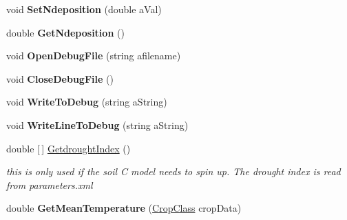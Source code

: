 \begin{DoxyCompactItemize}
\item 
\mbox{\label{struct_global_vars_1_1zone_specific_data_aadeeac9ab87500a320f305f8e1c41c98}} 
void {\bfseries Set\+Ndeposition} (double a\+Val)
\item 
\mbox{\label{struct_global_vars_1_1zone_specific_data_a90ad22f1144d1dc0f9bbeeacbecfae0d}} 
double {\bfseries Get\+Ndeposition} ()
\item 
\mbox{\label{struct_global_vars_1_1zone_specific_data_a016b9b6888f6421e60fd9097379220e9}} 
void {\bfseries Open\+Debug\+File} (string afilename)
\item 
\mbox{\label{struct_global_vars_1_1zone_specific_data_a073364a6434d45e728cfec31993dbdf2}} 
void {\bfseries Close\+Debug\+File} ()
\item 
\mbox{\label{struct_global_vars_1_1zone_specific_data_aac8e7ce5bf98d302eafd2d4504e51323}} 
void {\bfseries Write\+To\+Debug} (string a\+String)
\item 
\mbox{\label{struct_global_vars_1_1zone_specific_data_aab0e6941ab8bf492990a6e07386f6203}} 
void {\bfseries Write\+Line\+To\+Debug} (string a\+String)
\item 
\mbox{\label{struct_global_vars_1_1zone_specific_data_a016ebda431a899b09ebdf836949f0035}} 
double \mbox{[}$\,$\mbox{]} \mbox{\hyperlink{struct_global_vars_1_1zone_specific_data_a016ebda431a899b09ebdf836949f0035}{Getdrought\+Index}} ()
\begin{DoxyCompactList}\small\item\em this is only used if the soil C model needs to spin up. The drought index is read from parameters.\+xml \end{DoxyCompactList}\item 
\mbox{\label{struct_global_vars_1_1zone_specific_data_a8d52babdca2e3209f22a58ed7d1824ba}} 
double {\bfseries Get\+Mean\+Temperature} (\mbox{\hyperlink{class_crop_class}{Crop\+Class}} crop\+Data)

\end{DoxyCompactItemize}
